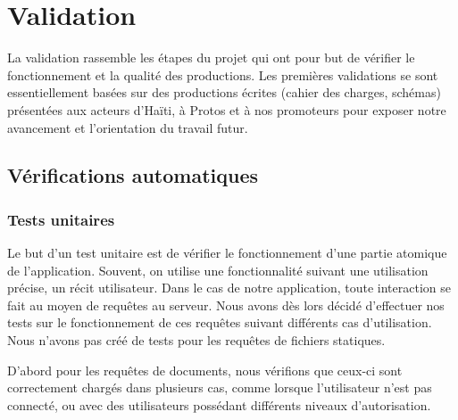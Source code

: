 \documentclass{EPL-master-thesis-covers-FR}
\begin{document}
	\chapter{Validation}

		La validation rassemble les étapes du projet qui ont pour but de vérifier le fonctionnement et la qualité des productions. Les premières validations se sont essentiellement basées sur des productions écrites (cahier des charges, schémas) présentées aux acteurs d'Haïti, à Protos et à nos promoteurs pour exposer notre avancement et l'orientation du travail futur.




		\section{Vérifications automatiques}

			\subsection*{Tests unitaires}

				Le but d'un test unitaire est de vérifier le fonctionnement d'une partie atomique de l'application. Souvent, on utilise une fonctionnalité suivant une utilisation précise, un récit utilisateur. Dans le cas de notre application, toute interaction se fait au moyen de requêtes au serveur. Nous avons dès lors décidé d'effectuer nos tests sur le fonctionnement de ces requêtes suivant différents cas d'utilisation. Nous n'avons pas créé de tests pour les requêtes de fichiers statiques.

				D'abord pour les requêtes de documents, nous vérifions que ceux-ci sont correctement chargés dans plusieurs cas, comme lorsque l'utilisateur n'est pas connecté, ou avec des utilisateurs possédant différents niveaux d'autorisation.
\end{document}
